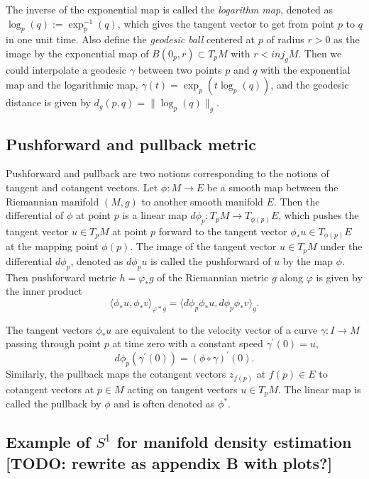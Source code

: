 \documentclass[11pt,a4paper,]{article}
\begin{document}
The inverse of the exponential map is called the \emph{logarithm map}, denoted as \(\log_p(q):= \exp^{-1}_p(q)\), which gives the tangent vector to get from point \(p\) to \(q\) in one unit time. Also define the \emph{geodesic ball} centered at \(p\) of radius \(r > 0\) as the image by the exponential map of \(B(0_p, r) \subset T_pM\) with \(r < \textit{inj}_gM\). Then we could interpolate a geodesic \(\gamma\) between two points \(p\) and \(q\) with the exponential map and the logarithmic map, \(\gamma(t) = \exp_p(t\log_p(q))\), and the geodesic distance is given by \(d_g(p,q) = \|\log_p(q)\|_g\).

\hypertarget{pushforward-and-pullback-metric}{%
\subsection{Pushforward and pullback metric}\label{pushforward-and-pullback-metric}}

Pushforward and pullback are two notions corresponding to the notions of tangent and cotangent vectors.
Let \(\phi: M \rightarrow E\) be a smooth map between the Riemannian manifold \((M,g)\) to another smooth manifold \(E\). Then the differential of \(\phi\) at point \(p\) is a linear map \(d\phi_p: T_pM \rightarrow T_{\phi (p)}E\), which pushes the tangent vector \(u \in T_pM\) at point \(p\) forward to the tangent vector \(\phi_*u \in T_{\phi (p)}E\) at the mapping point \(\phi(p)\).
The image of the tangent vector \(u \in T_pM\) under the differential \(d\phi_p\), denoted as \(d\phi_p u\) is called the pushforward of \(u\) by the map \(\phi\).
Then pushforward metric \(h=\varphi_*g\) of the Riemannian metric \(g\) along \(\varphi\) is given by the inner product
\[
\langle \phi_*u,\phi_*v \rangle_{\varphi*g} = \langle d\phi_p \phi_*u, d\phi_p \phi_*v \rangle_{g}.
\]

The tangent vectors \(\phi_*u\) are equivalent to the velocity vector of a curve \(\gamma: I\rightarrow M\) passing through point \(p\) at time zero with a constant speed \(\gamma^{\prime}(0)=u\),
\[
d\phi_p(\gamma^{\prime}(0)) = (\phi \circ \gamma)^\prime (0).
\]
Similarly, the pullback maps the cotangent vectors \(z_{f(p)}\) at \(f(p) \in E\) to cotangent vectors at \(p \in M\) acting on tangent vectors \(u \in T_pM\). The linear map is called the pullback by \(\phi\) and is often denoted as \(\phi^*\).

\hypertarget{example-of-s1-for-manifold-density-estimation-todo-rewrite-as-appendix-b-with-plots}{%
\subsection{\texorpdfstring{Example of \(S^1\) for manifold density estimation {[}TODO: rewrite as appendix B with plots?{]}}{Example of S\^{}1 for manifold density estimation {[}TODO: rewrite as appendix B with plots?{]}}}\label{example-of-s1-for-manifold-density-estimation-todo-rewrite-as-appendix-b-with-plots}}
\end{document}
